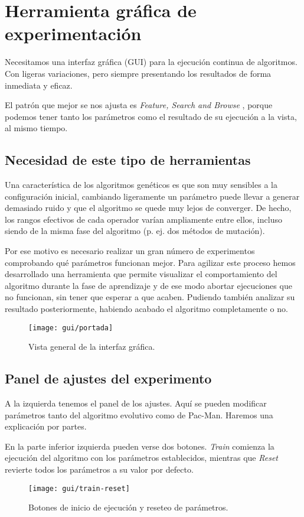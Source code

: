 \chapter{Herramienta gráfica de experimentación} \label{cap:herramienta-grafica}
Necesitamos una interfaz gráfica (GUI) para la ejecución continua de algoritmos. Con ligeras variaciones, pero siempre presentando los resultados de forma inmediata y eficaz.

El patrón que mejor se nos ajusta es \textit{Feature, Search and Browse} \cite{tidwell2010designing}, porque podemos tener tanto los parámetros como el resultado de su ejecución a la vista, al mismo tiempo.

\section{Necesidad de este tipo de herramientas}
Una característica de los algoritmos genéticos es que son muy sensibles a la configuración inicial, cambiando ligeramente un parámetro puede llevar a generar demasiado ruido y que el algoritmo se quede muy lejos de converger. De hecho, los rangos efectivos de cada operador varían ampliamente entre ellos, incluso siendo de la misma fase del algoritmo (p. ej. dos métodos de mutación).

Por ese motivo es necesario realizar un gran número de experimentos comprobando qué parámetros funcionan mejor. Para agilizar este proceso hemos desarrollado una herramienta que permite visualizar el comportamiento del algoritmo durante la fase de aprendizaje y de ese modo abortar ejecuciones que no funcionan, sin tener que esperar a que acaben. Pudiendo también analizar su resultado posteriormente, habiendo acabado el algoritmo completamente o no.

\begin{figure}[H]
\centering
\texttt{[image: gui/portada]}
\caption{Vista general de la interfaz gráfica.}
\end{figure}

\section{Panel de ajustes del experimento}
A la izquierda tenemos el panel de los ajustes. Aquí se pueden modificar parámetros tanto del algoritmo evolutivo como de Pac-Man. Haremos una explicación por partes.
 
En la parte inferior izquierda pueden verse dos botones. \textit{Train} comienza la ejecución del algoritmo con los parámetros establecidos, mientras que \textit{Reset} revierte todos los parámetros a su valor por defecto.
\begin{figure}[H]
\centering
\texttt{[image: gui/train-reset]}
\caption{Botones de inicio de ejecución y reseteo de parámetros.}
\end{figure}

